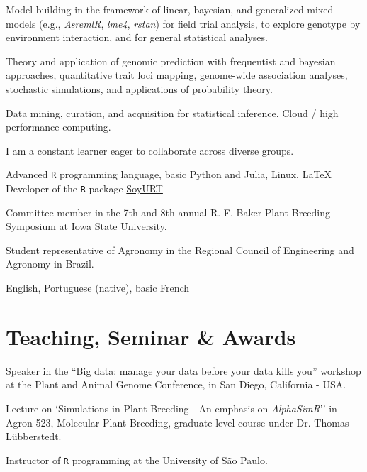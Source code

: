 \documentclass[]{mdkrause_cv_openfont}
\begin{document}
\begin{minipage}[t]{1\textwidth}
\begin{tightemize}
	\vspace{0.5 mm}
	\item Model building in the framework of linear, bayesian, and generalized mixed models (e.g., \textit{AsremlR}, \textit{lme4}, \textit{rstan}) for field trial analysis, to explore genotype by environment interaction, and for general statistical analyses. 
	\item Theory and application of genomic prediction with frequentist and bayesian approaches, quantitative trait loci mapping, genome-wide association analyses, stochastic simulations, and applications of probability theory.
	\item Data mining, curation, and acquisition for statistical inference. Cloud / high performance computing.	
	\item I am a constant learner eager to collaborate across diverse groups.
\end{tightemize}

\sectionsep

Advanced \texttt{R} programming language, basic Python and Julia, Linux, \LaTeX \hspace{1 mm} \textbullet{} Developer of the \texttt{R} package \href{https://cran.r-project.org/web/packages/SoyURT/index.html}{SoyURT} \ExternalLink

\sectionsep

\begin{tightemize}
	\item {} Committee member in the 7th and 8th annual R. F. Baker Plant Breeding Symposium at Iowa State University.
	\item {} Student representative of Agronomy in the Regional Council of Engineering and Agronomy in Brazil.
\end{tightemize}

\sectionsep

English, Portuguese (native), basic French

\sectionsep

\section{Teaching, Seminar \& Awards}

\sectionsep

\begin{tightemize}
	\item {} Speaker in the ``Big data: manage your data before your data kills you'' workshop at the Plant and Animal Genome Conference, in San Diego, California - USA.
	\item {} Lecture on `Simulations in Plant Breeding - An emphasis on \emph{AlphaSimR}'' in Agron 523, Molecular Plant Breeding, graduate-level course under Dr. Thomas Lübberstedt. 
	\item {} Instructor of \texttt{R} programming at the University of São Paulo.
\end{tightemize}


\end{minipage}
\end{document}
